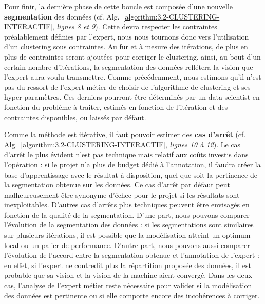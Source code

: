 		Pour finir, la dernière phase de cette boucle est composée d'une nouvelle \textbf{segmentation} des données (cf. Alg.~\ref{algorithm:3.2-CLUSTERING-INTERACTIF}, \textit{lignes 8 et 9}). Cette devra respecter les contraintes préalablement définies par l'expert, nous nous tournons donc vers l'utilisation d'un clustering sous contraintes.
		Au fur et à mesure des itérations, de plus en plus de contraintes seront ajoutées pour corriger le clustering. ainsi, au bout d'un certain nombre d'itérations, la segmentation des données reflétera la vision que l'expert aura voulu transmettre.
		Comme précédemment, nous estimons qu'il n'est pas du ressort de l'expert métier de choisir de l'algorithme de clustering et ses hyper-paramètres. Ces derniers pourront être déterminés par un data scientist en fonction du problème à traiter, estimés en fonction de l'itération et des contraintes disponibles, ou laissés par défaut.
		
		Comme la méthode est itérative, il faut pouvoir estimer des \textbf{cas d'arrêt} (cf. Alg.~\ref{algorithm:3.2-CLUSTERING-INTERACTIF}, \textit{lignes 10 à 12}).
		Le cas d'arrêt le plus évident n'est pas technique mais relatif aux coûts investis dans l'opération : si le projet n'a plus de budget dédié à l'annotation, il faudra créer la base d'apprentissage avec le résultat à disposition, quel que soit la pertinence de la segmentation obtenue sur les données. Ce cas d'arrêt par défaut peut malheureusement être synonyme d'échec pour le projet si les résultats sont inexploitables.
		D'autres cas d'arrêts plus techniques peuvent être envisagés en fonction de la qualité de la segmentation.
		D'une part, nous pouvons comparer l'évolution de la segmentation des données : si les segmentations sont similaires sur plusieurs itérations, il est possible que la modélisation atteint un optimum local ou un palier de performance.
		D'autre part, nous pouvons aussi comparer l'évolution de l'accord entre la segmentation obtenue et l'annotation de l'expert : en effet, si l'expert ne contredit plus la répartition proposée des données, il est probable que sa vision et la vision de la machine aient convergé.
		Dans les deux cas, l'analyse de l'expert métier reste nécessaire pour valider si la modélisation des données est pertinente ou si elle comporte encore des incohérences à corriger.

